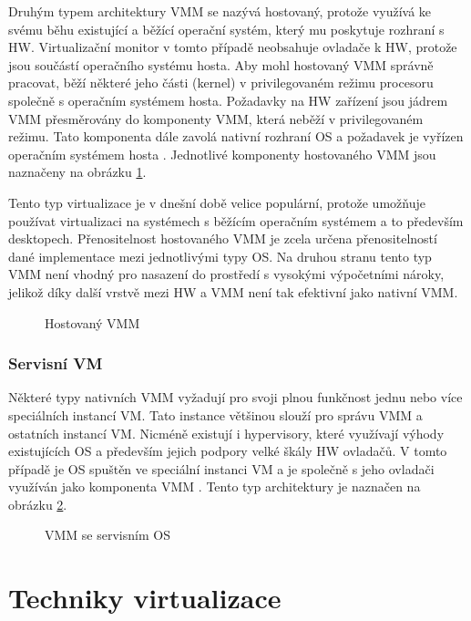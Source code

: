 Druhým typem architektury VMM se nazývá hostovaný, protože využívá ke svému běhu existující a běžící operační systém, který mu poskytuje rozhraní s HW. Virtualizační monitor v tomto případě neobsahuje ovladače k HW, protože jsou
součástí operačního systému hosta. Aby mohl hostovaný VMM správně pracovat, běží některé jeho části (kernel) v privilegovaném režimu procesoru společně s operačním systémem hosta. Požadavky na HW zařízení jsou jádrem VMM přesměrovány
do komponenty VMM, která neběží v privilegovaném režimu. Tato komponenta dále zavolá nativní rozhraní OS a požadavek je vyřízen operačním systémem hosta \cite{vmm1}. Jednotlivé komponenty hostovaného VMM jsou naznačeny na obrázku \ref{hosted_vmm}.

Tento typ virtualizace je v dnešní době velice populární, protože umožňuje používat virtualizaci na systémech s běžícím operačním systémem a to především desktopech. Přenositelnost hostovaného VMM je zcela určena přenositelností 
dané implementace mezi jednotlivými typy OS. Na druhou stranu tento typ VMM není vhodný pro nasazení do prostředí s vysokými výpočetními nároky, jelikož díky další vrstvě mezi HW a VMM není tak efektivní jako nativní VMM.

\begin{figure}
    \centering    
    \caption{Hostovaný VMM}
    \label{hosted_vmm}
\end{figure}

\subsubsection*{Servisní VM}

Některé typy nativních VMM vyžadují pro svoji plnou funkčnost jednu nebo více speciálních instancí VM. Tato instance většinou slouží pro správu VMM a ostatních instancí VM. Nicméně existují i hypervisory, které využívají výhody
existujících OS a především jejich podpory velké škály HW ovladačů. V tomto případě je OS spuštěn ve speciální instanci VM a je společně s jeho ovladači využíván jako komponenta VMM \cite{vmm1}. Tento typ architektury je 
naznačen na obrázku \ref{servise_vmm}.

\begin{figure}
    \centering    
    \caption{VMM se servisním OS}
    \label{servise_vmm}
\end{figure}

\section{Techniky virtualizace}
\label{virt_techniques}

